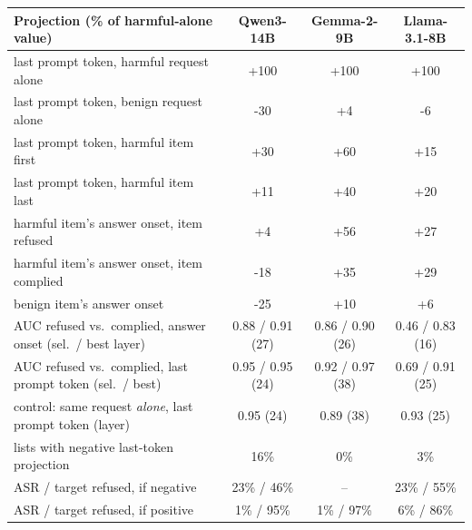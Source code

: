 \begin{tabular}{lccc}
\toprule
Projection (\% of harmful-alone value) & Qwen3-14B & Gemma-2-9B & Llama-3.1-8B \\
\midrule
last prompt token, harmful request alone & +100 & +100 & +100 \\
last prompt token, benign request alone & -30 & +4 & -6 \\
\midrule
last prompt token, harmful item first & +30 & +60 & +15 \\
last prompt token, harmful item last & +11 & +40 & +20 \\
\midrule
harmful item's answer onset, item refused & +4 & +56 & +27 \\
harmful item's answer onset, item complied & -18 & +35 & +29 \\
benign item's answer onset & -25 & +10 & +6 \\
\midrule
AUC refused vs.\ complied, answer onset (sel.\ / best layer) & 0.88 / 0.91 (27) & 0.86 / 0.90 (26) & 0.46 / 0.83 (16) \\
AUC refused vs.\ complied, last prompt token (sel.\ / best) & 0.95 / 0.95 (24) & 0.92 / 0.97 (38) & 0.69 / 0.91 (25) \\
\quad control: same request \emph{alone}, last prompt token (layer) & 0.95 (24) & 0.89 (38) & 0.93 (25) \\
\midrule
lists with negative last-token projection & 16\% & 0\% & 3\% \\
\quad ASR / target refused, if negative & 23\% / 46\% & -- & 23\% / 55\% \\
\quad ASR / target refused, if positive & 1\% / 95\% & 1\% / 97\% & 6\% / 86\% \\
\bottomrule
\end{tabular}